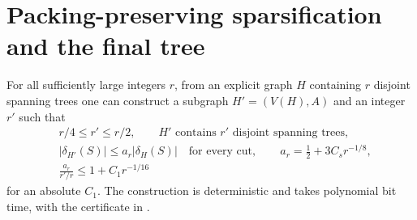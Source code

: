 \section{Packing-preserving sparsification and the final tree}
\label{sec:iteration}


\begin{lemma}
\label{lem:ta-sparsification}
For all sufficiently large integers $r$, from an explicit graph $H$
containing $r$ disjoint spanning trees one can construct a subgraph
$H'=(V(H),A)$ and an integer $r'$ such that
\begin{align}
 &r/4\le r'\le r/2,\qquad H'\text{ contains }r'\text{ disjoint spanning trees},
          \label{eq:ta-packing-halving}\\
 &|\delta_{H'}(S)|\le a_r|\delta_H(S)|\quad\text{for every cut},
       \qquad a_r=\tfrac12+3C_s r^{-1/8},
          \label{eq:ta-cut-halving}\\
 &\frac{a_r}{r'/r}\le1+C_1r^{-1/16}
          \label{eq:ta-ratio-loss}
\end{align}
for an absolute $C_1$. The construction is deterministic and takes
polynomial bit time, with the certificate in .
\end{lemma}

